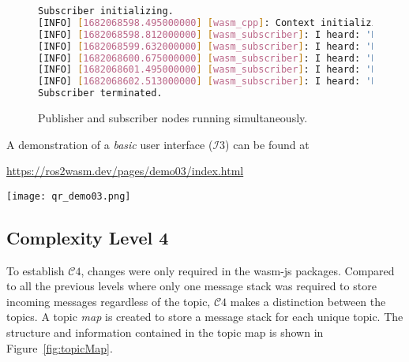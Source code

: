 \begin{figure}[htbp]
            \begin{lstlisting}[language=bash]
Subscriber initializing.
[INFO] [1682068598.495000000] [wasm_cpp]: Context initializing.
[INFO] [1682068598.812000000] [wasm_subscriber]: I heard: 'Hello there! 18'
[INFO] [1682068599.632000000] [wasm_subscriber]: I heard: 'Hello there! 19'
[INFO] [1682068600.675000000] [wasm_subscriber]: I heard: 'Hello there! 20'
[INFO] [1682068601.495000000] [wasm_subscriber]: I heard: 'Hello there! 21'
[INFO] [1682068602.513000000] [wasm_subscriber]: I heard: 'Hello there! 22'
Subscriber terminated.
\end{lstlisting}

            \caption{Publisher and subscriber nodes running simultaneously.}\label{fig:ui3}
        \end{figure}


        \vspace{2em}
        \begin{tcolorbox}[title=Example 6]
            \begin{minipage}[t]{0.87\linewidth}
                \vspace*{0.5\baselineskip}
                A demonstration of a \textit{basic} user interface ($\mathcal{I}3$) can be found at 
                
                \href{https://ros2wasm.dev/pages/demo03/index.html}{\textsf{https://ros2wasm.dev/pages/demo03/index.html}}
            \end{minipage}\hfill%
            \begin{minipage}[t]{0.1\linewidth}
                \vspace*{0pt}
                \texttt{[image: qr\_demo03.png]}
            \end{minipage}
        \end{tcolorbox}

        \pagebreak
        \subsection{Complexity Level 4}

        To establish $\mathcal{C}4$, changes were only required in the \textsf{wasm-js} packages. Compared to all the previous levels where only one message stack was required to store incoming messages regardless of the topic, $\mathcal{C}4$ makes a distinction between the topics. A topic \textit{map} is created to store a message stack for each unique topic. The structure and information contained in the topic map is shown in Figure~\ref{fig:topicMap}.


